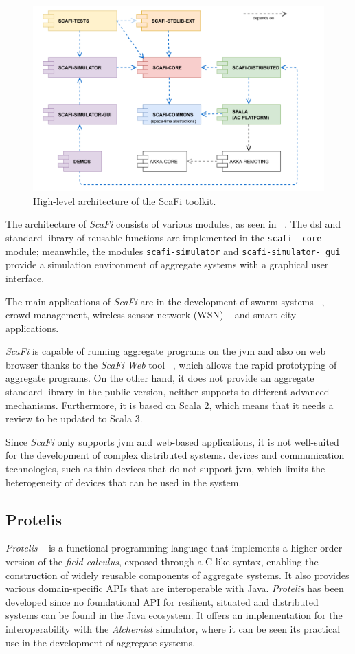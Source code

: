 \begin{figure}
    \centering
    \includegraphics[width=.7\linewidth]{figures/scafi-structure}
    \caption{High-level architecture of the ScaFi toolkit.}
    \label{fig:scafi-structure}
\end{figure}

The architecture of \emph{ScaFi} consists of various modules, as seen in ~.
The \ac{dsl} and standard library of reusable functions are implemented in the \texttt{scafi-
core} module; meanwhile, the modules \texttt{scafi-simulator} and \texttt{scafi-simulator-
gui} provide a simulation
environment of aggregate systems with a graphical user interface.

The main applications of \emph{ScaFi} are in the development of swarm systems ~\cite{10336236}, crowd management, wireless sensor network (WSN) ~\cite{9935036}
and smart city applications.

\emph{ScaFi} is capable of running aggregate programs on the \ac{jvm} and also on web browser thanks
to the \emph{ScaFi Web} tool ~\cite{10.1007/978-3-030-78142-2_18}, which allows the rapid prototyping of aggregate programs.
On the other hand, it does not provide an aggregate standard library in the public version, neither supports to
different advanced mechanisms.
Furthermore, it is based on Scala 2, which means that it needs a review to be updated to Scala 3.

Since \emph{ScaFi} only supports \ac{jvm} and web-based applications, it is not well-suited for the development of complex distributed systems.
devices and communication technologies, such as thin devices that do not support \ac{jvm}, which limits the heterogeneity of
devices that can be used in the system.

\subsection{Protelis}
\label{subsec:protelis}
\emph{Protelis} ~\cite{protelis} is a functional programming language that implements a higher-order version of the \emph{field calculus},
exposed through a C-like syntax, enabling the construction of widely reusable components of aggregate systems.
It also provides various domain-specific APIs that are interoperable with Java.
\emph{Protelis} has been developed since no foundational API for resilient, situated and distributed systems can be found
in the Java ecosystem.
It offers an implementation for the interoperability with the \emph{Alchemist} simulator, where it can be seen its
practical use in the development of aggregate systems.


